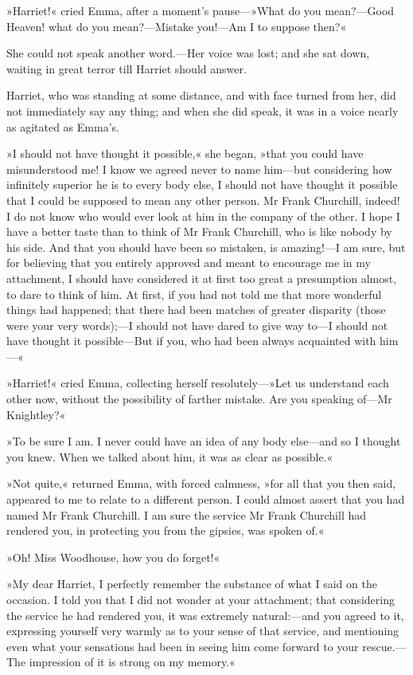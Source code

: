 »Harriet!« cried Emma, after a moment's pause—»What do you mean?—Good Heaven! what do you mean?—Mistake you!—Am I to suppose then?\longdash«

She could not speak another word.—Her voice was lost; and she sat down, waiting in great terror till Harriet should answer.

Harriet, who was standing at some distance, and with face turned from her, did not immediately say any thing; and when she did speak, it was in a voice nearly as agitated as Emma's.

»I should not have thought it possible,« she began, »that you could have misunderstood me! I know we agreed never to name him—but considering how infinitely superior he is to every body else, I should not have thought it possible that I could be supposed to mean any other person. Mr Frank Churchill, indeed! I do not know who would ever look at him in the company of the other. I hope I have a better taste than to think of Mr Frank Churchill, who is like nobody by his side. And that you should have been so mistaken, is amazing!—I am sure, but for believing that you entirely approved and meant to encourage me in my attachment, I should have considered it at first too great a presumption almost, to dare to think of him. At first, if you had not told me that more wonderful things had happened; that there had been matches of greater disparity (those were your very words);—I should not have dared to give way to—I should not have thought it possible—But if you, who had been always acquainted with him—«

»Harriet!« cried Emma, collecting herself resolutely—»Let us understand each other now, without the possibility of farther mistake. Are you speaking of—Mr Knightley?«

»To be sure I am. I never could have an idea of any body else—and so I thought you knew. When we talked about him, it was as clear as possible.«

»Not quite,« returned Emma, with forced calmness, »for all that you then said, appeared to me to relate to a different person. I could almost assert that you had named Mr Frank Churchill. I am sure the service Mr Frank Churchill had rendered you, in protecting you from the gipsies, was spoken of.«

»Oh! Miss Woodhouse, how you do forget!«

»My dear Harriet, I perfectly remember the substance of what I said on the occasion. I told you that I did not wonder at your attachment; that considering the service he had rendered you, it was extremely natural:—and you agreed to it, expressing yourself very warmly as to your sense of that service, and mentioning even what your sensations had been in seeing him come forward to your rescue.—The impression of it is strong on my memory.«

